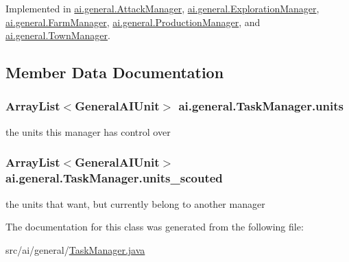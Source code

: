 Implemented in \hyperlink{classai_1_1general_1_1_attack_manager_a6776ff3d2b303c7f9301b94afb646b00}{ai.general.AttackManager}, \hyperlink{classai_1_1general_1_1_exploration_manager_ad505dd71852b360dc804dfbf160a0ea3}{ai.general.ExplorationManager}, \hyperlink{classai_1_1general_1_1_farm_manager_a93d1a886ee93738fcb6bea2cc5c230ff}{ai.general.FarmManager}, \hyperlink{classai_1_1general_1_1_production_manager_a21674afcbd70ba10ee88ed673569945b}{ai.general.ProductionManager}, and \hyperlink{classai_1_1general_1_1_town_manager_a3817fd7714079f01a3897b6322bc45cf}{ai.general.TownManager}.



\subsection{Member Data Documentation}
\hypertarget{classai_1_1general_1_1_task_manager_af1f1456711a8fae38008a1f257499a40}{
\subsubsection[{units}]{\setlength{\rightskip}{0pt plus 5cm}ArrayList$<${\bf GeneralAIUnit}$>$ {\bf ai.general.TaskManager.units}}}
\label{classai_1_1general_1_1_task_manager_af1f1456711a8fae38008a1f257499a40}
the units this manager has control over \hypertarget{classai_1_1general_1_1_task_manager_ab60f349ac3875cfa72322c09a318dfd1}{
\subsubsection[{units\_\-scouted}]{\setlength{\rightskip}{0pt plus 5cm}ArrayList$<${\bf GeneralAIUnit}$>$ {\bf ai.general.TaskManager.units\_\-scouted}}}
\label{classai_1_1general_1_1_task_manager_ab60f349ac3875cfa72322c09a318dfd1}
the units that want, but currently belong to another manager 

The documentation for this class was generated from the following file:\begin{DoxyCompactItemize}
\item 
src/ai/general/\hyperlink{_task_manager_8java}{TaskManager.java}\end{DoxyCompactItemize}
